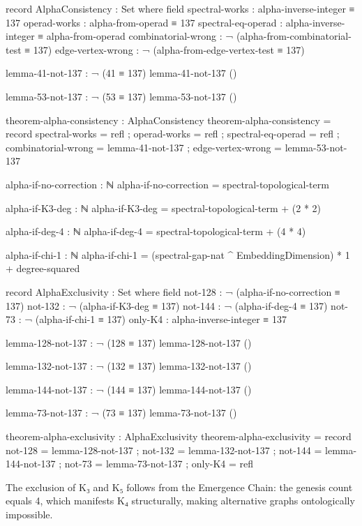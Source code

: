 \documentclass[11pt,a4paper]{book}
\begin{document}
\begin{code}
record AlphaConsistency : Set where
  field
    spectral-works     : alpha-inverse-integer ≡ 137
    operad-works       : alpha-from-operad ≡ 137
    spectral-eq-operad : alpha-inverse-integer ≡ alpha-from-operad
    combinatorial-wrong : ¬ (alpha-from-combinatorial-test ≡ 137)
    edge-vertex-wrong   : ¬ (alpha-from-edge-vertex-test ≡ 137)

lemma-41-not-137 : ¬ (41 ≡ 137)
lemma-41-not-137 ()

lemma-53-not-137 : ¬ (53 ≡ 137)
lemma-53-not-137 ()

theorem-alpha-consistency : AlphaConsistency
theorem-alpha-consistency = record
  { spectral-works     = refl
  ; operad-works       = refl
  ; spectral-eq-operad = refl
  ; combinatorial-wrong = lemma-41-not-137
  ; edge-vertex-wrong   = lemma-53-not-137
  }

alpha-if-no-correction : ℕ
alpha-if-no-correction = spectral-topological-term

alpha-if-K3-deg : ℕ
alpha-if-K3-deg = spectral-topological-term + (2 * 2)

alpha-if-deg-4 : ℕ
alpha-if-deg-4 = spectral-topological-term + (4 * 4)

alpha-if-chi-1 : ℕ
alpha-if-chi-1 = (spectral-gap-nat ^ EmbeddingDimension) * 1 + degree-squared

record AlphaExclusivity : Set where
  field
    not-128    : ¬ (alpha-if-no-correction ≡ 137)
    not-132    : ¬ (alpha-if-K3-deg ≡ 137)
    not-144    : ¬ (alpha-if-deg-4 ≡ 137)
    not-73     : ¬ (alpha-if-chi-1 ≡ 137)
    only-K4    : alpha-inverse-integer ≡ 137

lemma-128-not-137 : ¬ (128 ≡ 137)
lemma-128-not-137 ()

lemma-132-not-137 : ¬ (132 ≡ 137)
lemma-132-not-137 ()

lemma-144-not-137 : ¬ (144 ≡ 137)
lemma-144-not-137 ()

lemma-73-not-137 : ¬ (73 ≡ 137)
lemma-73-not-137 ()

theorem-alpha-exclusivity : AlphaExclusivity
theorem-alpha-exclusivity = record
  { not-128    = lemma-128-not-137
  ; not-132    = lemma-132-not-137
  ; not-144    = lemma-144-not-137
  ; not-73     = lemma-73-not-137
  ; only-K4    = refl
  }
\end{code}

The exclusion of K₃ and K₅ follows from the Emergence Chain: the genesis count equals 4, which manifests K₄ structurally, making alternative graphs ontologically impossible.
\end{document}
